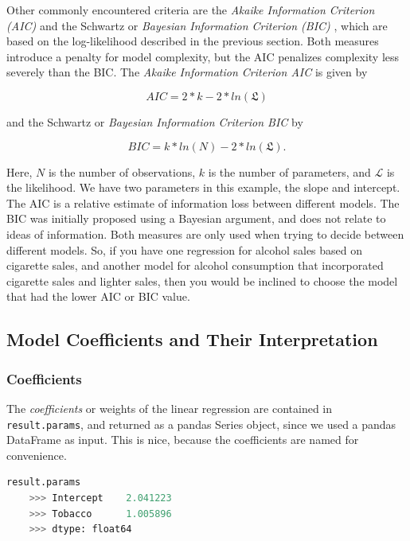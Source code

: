 Other commonly encountered criteria are the \emph{Akaike Information Criterion (AIC)}  and the Schwartz or \emph{Bayesian Information Criterion (BIC)} , which are based on the log-likelihood described in the previous section. Both measures introduce a penalty for model complexity, but the AIC penalizes complexity less severely than the BIC.
The \emph{Akaike Information Criterion AIC}  is given by

\begin{equation}
  AIC = 2*k - 2*ln(\mathfrak{L})
\end{equation}

and the Schwartz or \emph{Bayesian Information Criterion BIC}  by

\begin{equation}
  BIC = k*ln(N) - 2*ln(\mathfrak{L}) .
\end{equation}

Here, $N$ is the number of observations, $k$ is the number of parameters, and $\mathcal{L}$ is the likelihood. We have two parameters in this example, the slope and intercept. The AIC is a relative estimate of information loss between different models. The BIC was initially proposed using a Bayesian argument, and does not relate to ideas of information. Both measures are only used when trying to decide between different models. So, if you have one regression for alcohol sales based on cigarette sales, and another model for alcohol consumption that incorporated cigarette sales and lighter sales, then you would be inclined to choose the model that had the lower AIC or BIC value.

\subsection{Model Coefficients and Their Interpretation}

\subsubsection{Coefficients}
The \emph{coefficients} or weights of the linear regression are contained in \lstinline{result.params}, and returned as a pandas Series object, since we used a pandas DataFrame as input. This is nice, because the coefficients are named for convenience.

\begin{lstlisting}[language=Python]
    result.params
    >>> Intercept    2.041223
    >>> Tobacco      1.005896
    >>> dtype: float64
\end{lstlisting}


